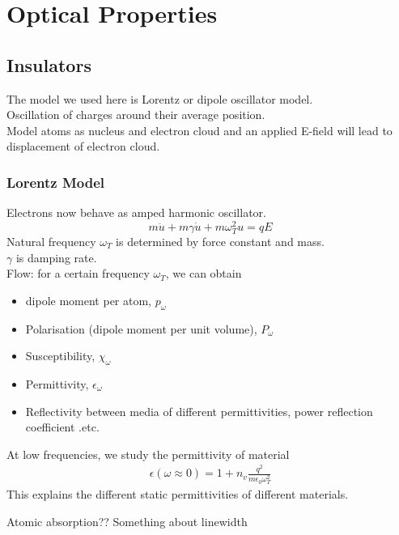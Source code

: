 \documentclass[12pt,a4paper]{article}
\title{\topic}
\begin{document}
\begin{titlepage}
    \maketitle
\end{titlepage}

\tableofcontents

\newpage

\begin{abstract}
\noindent
Abstract of this course
\end{abstract}

\section{Optical Properties}
\subsection{Insulators}
    The model we used here is Lorentz or dipole oscillator model.\\
    \indent Oscillation of charges around their average position.\\
    \indent Model atoms as nucleus and electron cloud and an applied E-field will lead to displacement of electron cloud.\\
    \subsubsection{Lorentz Model}
        Electrons now behave as amped harmonic oscillator.\\
        \begin{equation}
            m \ddot{u} + m\gamma\dot{u} + m\omega_T^2 u = qE
        \end{equation}
        Natural frequency $\omega_T$ is determined by force constant and mass.\\
        $\gamma$ is damping rate.\\
        Flow: for a certain frequency $\omega_T$, we can obtain
        \begin{itemize}
            \item {dipole moment per atom, $p_\omega$}
            \item {Polarisation (dipole moment per unit volume), $P_\omega$}
            \item {Susceptibility, $\chi_\omega$}
            \item {Permittivity, $\epsilon_\omega$}
            \item {Reflectivity between media of different permittivities, power reflection coefficient .etc.}
        \end{itemize}
        At low frequencies, we study the permittivity of material
        \begin{align}
            \epsilon (\omega\approx 0) = 1+ n_v \frac{q^2}{m\epsilon_0\omega_T^2}
        \end{align}
        This explains the different static permittivities of different materials.\\
        \begin{example}
            {Atomic absorption}{?? Something about linewidth}
        \end{example}
\end{document}
